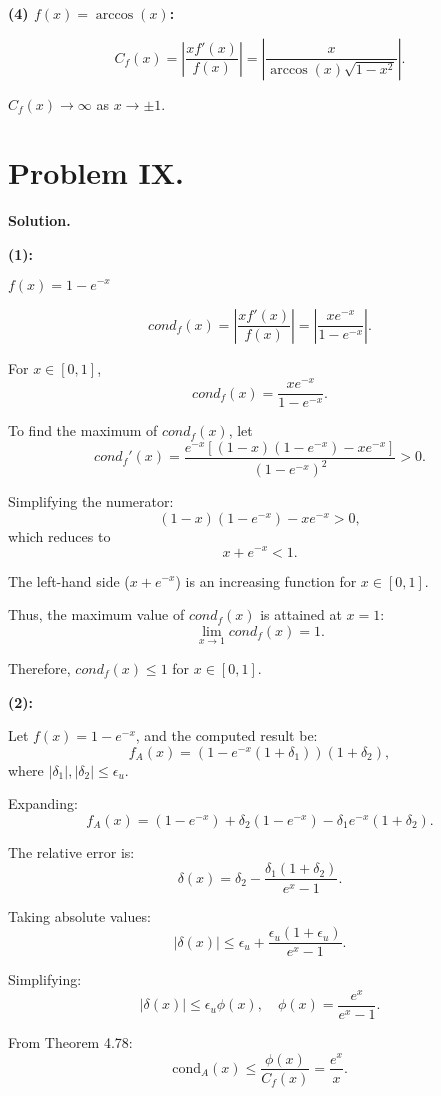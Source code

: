 \documentclass[a4paper]{article}
\begin{document}
\textbf{(4) \(f(x) = \arccos(x)\):}

\[
C_f(x) = \left|\frac{xf'(x)}{f(x)}\right| = \left|\frac{x}{\arccos(x) \sqrt{1 - x^2}}\right|.
\]

\(C_f(x) \to \infty\) as \(x \to \pm 1\).


\section*{Problem IX.}

\textbf{Solution.}

\textbf{(1):}  

\(f(x) = 1 - e^{-x}\)  

\[
cond_f(x) = \left|\frac{xf'(x)}{f(x)}\right| = \left|\frac{xe^{-x}}{1 - e^{-x}}\right|.
\]

For \(x \in [0,1]\),  
\[
cond_f(x) = \frac{xe^{-x}}{1 - e^{-x}}.
\]

To find the maximum of \(cond_f(x)\), let  
\[
cond_f'(x) = \frac{e^{-x}[(1-x)(1-e^{-x}) - xe^{-x}]}{(1 - e^{-x})^2} > 0.
\]

Simplifying the numerator:  
\[
(1-x)(1-e^{-x}) - xe^{-x} > 0,
\]
which reduces to  
\[
x + e^{-x} < 1.
\]

The left-hand side (\(x + e^{-x}\)) is an increasing function for \(x \in [0,1]\).  

Thus, the maximum value of \(cond_f(x)\) is attained at \(x = 1\):  
\[
\lim_{x \to 1} cond_f(x) = 1.
\]

Therefore, \(cond_f(x) \leq 1\) for \(x \in [0,1]\).

\textbf{(2):}

Let \( f(x) = 1 - e^{-x} \), and the computed result be:  
\[
f_A(x) = (1 - e^{-x}(1 + \delta_1))(1 + \delta_2),
\]
where \( |\delta_1|, |\delta_2| \leq \epsilon_u \).

Expanding:
\[
f_A(x) = (1 - e^{-x}) + \delta_2(1 - e^{-x}) - \delta_1 e^{-x}(1 + \delta_2).
\]

The relative error is:
\[
\delta(x) = \delta_2 - \frac{\delta_1(1 + \delta_2)}{e^x - 1}.
\]

Taking absolute values:
\[
|\delta(x)| \leq \epsilon_u + \frac{\epsilon_u (1 + \epsilon_u)}{e^x - 1}.
\]

Simplifying:
\[
|\delta(x)| \leq \epsilon_u \phi(x), \quad \phi(x) = \frac{e^x}{e^x - 1}.
\]

From Theorem 4.78:
\[
\text{cond}_A(x) \leq \frac{\phi(x)}{C_f(x)} = \frac{e^x}{x}.
\]
\end{document}
